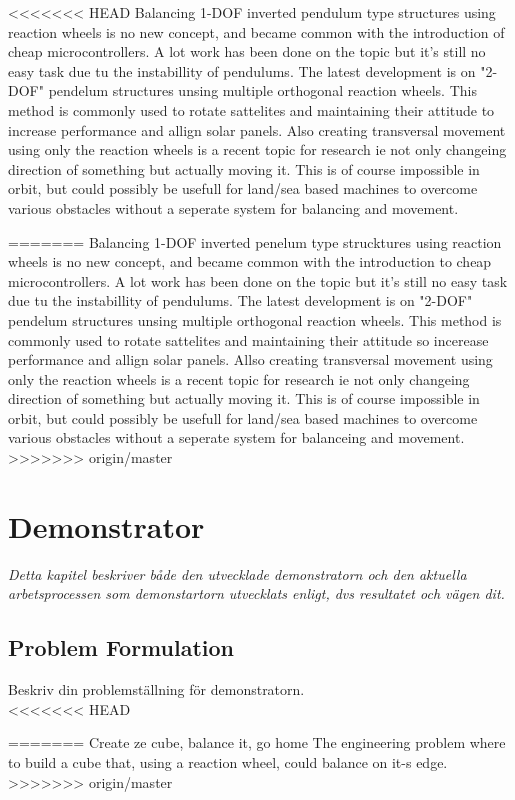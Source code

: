\documentclass[a4paper,11pt]{kth-mag}
\begin{document}
<<<<<<< HEAD
Balancing 1-DOF inverted pendulum type structures using reaction wheels is no new concept, and became common with the introduction of cheap microcontrollers. A lot work has been done on the topic but it's still no easy task due tu the instabillity of pendulums. The latest development is on "2-DOF" pendelum structures unsing multiple orthogonal reaction wheels. This method is commonly used to rotate sattelites and maintaining their attitude to increase performance and allign solar panels. 
Also creating transversal movement using only the reaction wheels is a recent topic for research ie not only changeing direction of something but actually moving it. This is of course impossible in orbit, but could possibly be usefull for land/sea based machines to overcome various obstacles without a seperate system for balancing and movement.
 
=======
Balancing 1-DOF inverted penelum type strucktures using reaction wheels is no new concept, and became common with the introduction to cheap microcontrollers. A lot work has been done on the topic but it's still no easy task due tu the instabillity of pendulums. The latest development is on "2-DOF" pendelum structures unsing multiple orthogonal reaction wheels. This method is commonly used to rotate sattelites and maintaining their attitude so incerease performance and allign solar panels. 
Allso creating transversal movement using only the reaction wheels is a recent topic for research ie not only changeing direction of something but actually moving it. This is of course impossible in orbit, but could possibly be usefull for land/sea based machines to overcome various obstacles without a seperate system for balanceing and movement. 
>>>>>>> origin/master
\chapter{Demonstrator}
\emph{Detta kapitel beskriver både den utvecklade demonstratorn och den aktuella arbetsprocessen som demonstartorn utvecklats enligt, dvs resultatet och vägen dit.}


\section{Problem Formulation}
Beskriv din problemställning för demonstratorn.\\
<<<<<<< HEAD

=======
Create ze cube, balance it, go home
The engineering problem where to build a cube that, using a reaction wheel, could balance on it-s edge.
>>>>>>> origin/master
\end{document}
